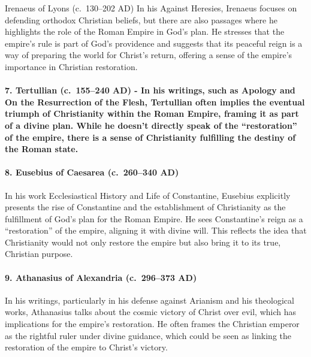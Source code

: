 Irenaeus of Lyons (c.~130--202 AD) In his Against Heresies, Irenaeus focuses on defending orthodox Christian beliefs, but there are also passages where he highlights the role of the Roman Empire in God's plan.
He stresses that the empire's rule is part of God's providence and suggests that its peaceful reign is a way of preparing the world for Christ's return, offering a sense of the empire's importance in Christian restoration.

\paragraph{7.
Tertullian (c.~155--240 AD) - In his writings, such as Apology and On the Resurrection of the Flesh, Tertullian often implies the eventual triumph of Christianity within the Roman Empire, framing it as part of a divine plan.
While he doesn't directly speak of the ``restoration'' of the empire, there is a sense of Christianity fulfilling the destiny of the Roman state.}\label{par:tertullian-c.-155240-ad---in-his-writings-such-as-apology-and-on-the-resurrection-of-the-flesh-tertullian-often-implies-the-eventual-triumph-of-christianity-within-the-roman-empire-framing-it-as-part-of-a-divine-plan.-while-he-doesnt-directly-speak-of-the-restoration-of-the-empire-there-is-a-sense-of-christianity-fulfilling-the-destiny-of-the-roman-state.}

\paragraph{8.
Eusebius of Caesarea (c.~260--340 AD)}\label{par:eusebius-of-caesarea-c.-260340-ad}

In his work Ecclesiastical History and Life of Constantine, Eusebius explicitly presents the rise of Constantine and the establishment of Christianity as the fulfillment of God's plan for the Roman Empire.
He sees Constantine's reign as a ``restoration'' of the empire, aligning it with divine will.
This reflects the idea that Christianity would not only restore the empire but also bring it to its true, Christian purpose.

\paragraph{9.
Athanasius of Alexandria (c.~296--373 AD)}\label{par:athanasius-of-alexandria-c.-296373-ad}

In his writings, particularly in his defense against Arianism and his theological works, Athanasius talks about the cosmic victory of Christ over evil, which has implications for the empire's restoration.
He often frames the Christian emperor as the rightful ruler under divine guidance, which could be seen as linking the restoration of the empire to Christ's victory.

